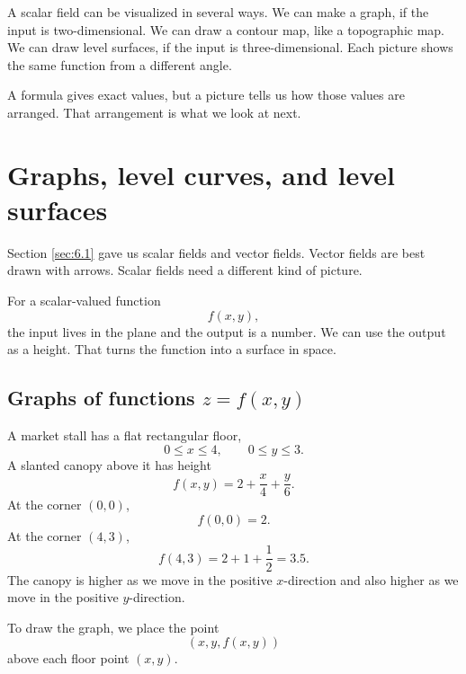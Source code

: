 A scalar field can be visualized in several ways.  We can make a graph, if the input is
two-dimensional.  We can draw a contour map, like a topographic map.  We can draw
level surfaces, if the input is three-dimensional.  Each picture shows the same function
from a different angle.

A formula gives exact values, but a picture tells us how those values are arranged.
That arrangement is what we look at next.

\section{Graphs, level curves, and level surfaces}
\label{sec:6.2}

Section \ref{sec:6.1} gave us scalar fields and vector fields.  Vector fields are best
drawn with arrows.  Scalar fields need a different kind of picture.

For a scalar-valued function
\[
    f(x,y),
\]
the input lives in the plane and the output is a number.  We can use the output as a
height.  That turns the function into a surface in space.

\subsection{Graphs of functions \texorpdfstring{\(z=f(x,y)\)}{z=f(x,y)}}

A market stall has a flat rectangular floor,
\[
    0\le x\le 4,\qquad 0\le y\le 3.
\]
A slanted canopy above it has height
\[
    f(x,y)=2+\frac{x}{4}+\frac{y}{6}.
\]
At the corner \((0,0)\),
\[
    f(0,0)=2.
\]
At the corner \((4,3)\),
\[
    f(4,3)=2+1+\frac12=3.5.
\]
The canopy is higher as we move in the positive \(x\)-direction and also higher as we
move in the positive \(y\)-direction.

To draw the graph, we place the point
\[
    (x,y,f(x,y))
\]
above each floor point \((x,y)\).

